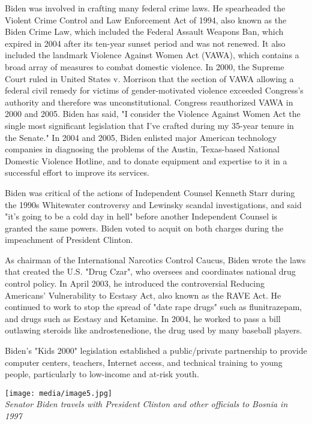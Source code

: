 Biden was involved in crafting many federal crime laws. He spearheaded
the Violent Crime Control and Law Enforcement Act of 1994, also known as
the Biden Crime Law, which included the Federal Assault Weapons Ban,
which expired in 2004 after its ten-year sunset period and was not
renewed. It also included the landmark Violence Against Women Act
(VAWA), which contains a broad array of measures to combat domestic
violence. In 2000, the Supreme Court ruled in United States v. Morrison
that the section of VAWA allowing a federal civil remedy for victims of
gender-motivated violence exceeded Congress's authority and therefore
was unconstitutional. Congress reauthorized VAWA in 2000 and 2005. Biden
has said, "I consider the Violence Against Women Act the single most
significant legislation that I've crafted during my 35-year tenure in
the Senate." In 2004 and 2005, Biden enlisted major American technology
companies in diagnosing the problems of the Austin, Texas-based National
Domestic Violence Hotline, and to donate equipment and expertise to it
in a successful effort to improve its services.

Biden was critical of the actions of Independent Counsel Kenneth Starr
during the 1990s Whitewater controversy and Lewinsky scandal
investigations, and said "it's going to be a cold day in hell" before
another Independent Counsel is granted the same powers. Biden voted to
acquit on both charges during the impeachment of President Clinton.

As chairman of the International Narcotics Control Caucus, Biden wrote
the laws that created the U.S. "Drug Czar", who oversees and coordinates
national drug control policy. In April 2003, he introduced the
controversial Reducing Americans' Vulnerability to Ecstasy Act, also
known as the RAVE Act. He continued to work to stop the spread of "date
rape drugs" such as flunitrazepam, and drugs such as Ecstasy and
Ketamine. In 2004, he worked to pass a bill outlawing steroids like
androstenedione, the drug used by many baseball players.

Biden's "Kids 2000" legislation established a public/private partnership
to provide computer centers, teachers, Internet access, and technical
training to young people, particularly to low-income and at-risk youth.

\texttt{[image: media/image5.jpg]}\\
\emph{Senator Biden travels with President Clinton and other officials
to Bosnia in 1997}

